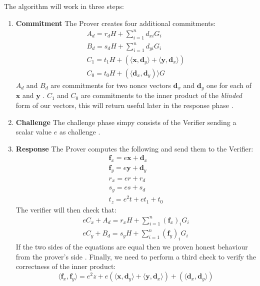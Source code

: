\documentclass[sigconf,screen,nonacm]{acmart}
\begin{document}
  The algorithm will work in three steps:
  \begin{enumerate}
    \item \textbf{Commitment} The Prover creates four additional commitments:
      \begin{align}
        A_d = r_dH + \sum_{i=1}^n d_{xi}G_i \\
        B_d = s_dH + \sum_{i=1}^n d_{yi}G_i \\
        C_1 = t_1H + (\langle \mathbf{x}, \mathbf{d}_y \rangle + \langle \mathbf{y}, \mathbf{d}_x \rangle) \\
        C_0 = t_0H + (\langle \mathbf{d}_x, \mathbf{d}_y ) \rangle G
      \end{align}
      $A_d$ and $B_d$ are commitments for two nonce vectors $\mathbf{d}_x$ and
      $\mathbf{d}_y$ one for each of $\mathbf{x}$ and $\mathbf{y}$ \cite{Gibson22}.
      $C_1$ and $C_0$ are commitments to the inner product of the \emph{blinded}
      form of our vectors, this will return useful later in the response phase
      \cite{Gibson22}.
    \item \textbf{Challenge} The challenge phase simpy consists of the Verifier
      sending a scalar value $e$ as challenge \cite{Gibson22}.
    \item \textbf{Response} The Prover computes the following and send them to the
      Verifier:
      \begin{align}
        \mathbf{f}_x = e\mathbf{x} + \mathbf{d}_x \\
        \mathbf{f}_y = e\mathbf{y} + \mathbf{d}_y \\
        r_x = er + r_d \\
        s_y = es + s_d \\
        t_z = e^2t + et_1 + t_0
      \end{align}
      The verifier will then check that:
      \begin{align}
        eC_x + A_d = r_xH + \sum_{i=1}^n (\mathbf{f}_x)_iG_i\\
        eC_y + B_d = s_yH + \sum_{i=1}^n (\mathbf{f}_y)_iG_i
      \end{align}
      If the two sides of the equations are equal then we proven honest behaviour
      from the prover's side \cite{Gibson22}. Finally, we need to perform a third
      check to verify the correctness of the inner product:
      \begin{equation}
        \langle \mathbf{f}_x, \mathbf{f}_y \rangle = e^2z + e(\langle \mathbf{x}, \mathbf{d}_y \rangle + \langle \mathbf{y}, \mathbf{d}_x \rangle) + (\langle \mathbf{d}_x, \mathbf{d}_y \rangle )
      \end{equation}
  \end{enumerate}
\end{document}
